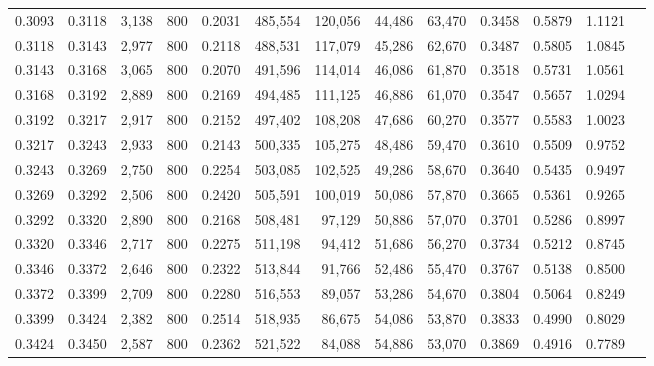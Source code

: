 \begin{tabular}{rrrrrrrrrrrrr}
0.3093 & 0.3118 &  3,138 &   800 &                                     0.2031 & 485,554 & 120,056 &  44,486 &  63,470 & 0.3458 & 0.5879 & 1.1121 \\
0.3118 & 0.3143 &  2,977 &   800 &                                     0.2118 & 488,531 & 117,079 &  45,286 &  62,670 & 0.3487 & 0.5805 & 1.0845 \\
0.3143 & 0.3168 &  3,065 &   800 &                                     0.2070 & 491,596 & 114,014 &  46,086 &  61,870 & 0.3518 & 0.5731 & 1.0561 \\
0.3168 & 0.3192 &  2,889 &   800 &                                     0.2169 & 494,485 & 111,125 &  46,886 &  61,070 & 0.3547 & 0.5657 & 1.0294 \\
0.3192 & 0.3217 &  2,917 &   800 &                                     0.2152 & 497,402 & 108,208 &  47,686 &  60,270 & 0.3577 & 0.5583 & 1.0023 \\
0.3217 & 0.3243 &  2,933 &   800 &                                     0.2143 & 500,335 & 105,275 &  48,486 &  59,470 & 0.3610 & 0.5509 & 0.9752 \\
0.3243 & 0.3269 &  2,750 &   800 &                                     0.2254 & 503,085 & 102,525 &  49,286 &  58,670 & 0.3640 & 0.5435 & 0.9497 \\
0.3269 & 0.3292 &  2,506 &   800 &                                     0.2420 & 505,591 & 100,019 &  50,086 &  57,870 & 0.3665 & 0.5361 & 0.9265 \\
0.3292 & 0.3320 &  2,890 &   800 &                                     0.2168 & 508,481 &  97,129 &  50,886 &  57,070 & 0.3701 & 0.5286 & 0.8997 \\
0.3320 & 0.3346 &  2,717 &   800 &                                     0.2275 & 511,198 &  94,412 &  51,686 &  56,270 & 0.3734 & 0.5212 & 0.8745 \\
0.3346 & 0.3372 &  2,646 &   800 &                                     0.2322 & 513,844 &  91,766 &  52,486 &  55,470 & 0.3767 & 0.5138 & 0.8500 \\
0.3372 & 0.3399 &  2,709 &   800 &                                     0.2280 & 516,553 &  89,057 &  53,286 &  54,670 & 0.3804 & 0.5064 & 0.8249 \\
0.3399 & 0.3424 &  2,382 &   800 &                                     0.2514 & 518,935 &  86,675 &  54,086 &  53,870 & 0.3833 & 0.4990 & 0.8029 \\
0.3424 & 0.3450 &  2,587 &   800 &                                     0.2362 & 521,522 &  84,088 &  54,886 &  53,070 & 0.3869 & 0.4916 & 0.7789 \\

\end{tabular}
